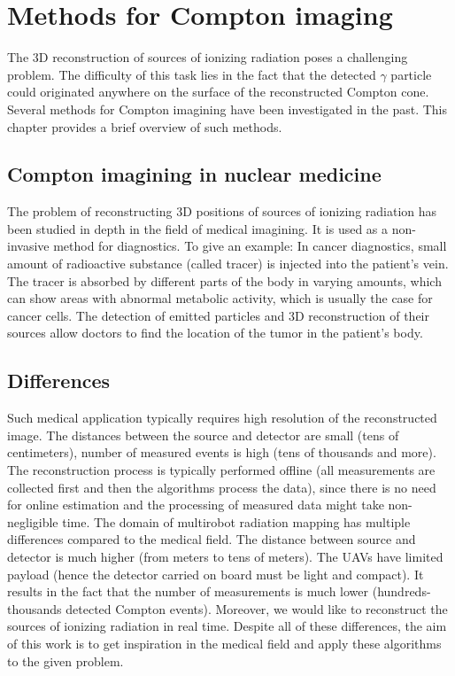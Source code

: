 \chapter{Methods for Compton imaging}
The 3D reconstruction of sources of ionizing radiation poses a challenging problem.
The difficulty of this task lies in the fact that the detected $\gamma$ particle could originated anywhere on the surface of the reconstructed Compton cone.
Several methods for Compton imagining have been investigated in the past.
This chapter provides a brief overview of such methods.

\section{Compton imagining in nuclear medicine}
The problem of reconstructing 3D positions of sources of ionizing radiation has been studied in depth in the field of medical imagining.
It is used as a non-invasive method for diagnostics.
To give an example:
In cancer diagnostics, small amount of radioactive substance (called tracer) is injected into the patient's vein.
The tracer is absorbed by different parts of the body in varying amounts, which can show areas with abnormal metabolic activity, which is usually the case for cancer cells.
The detection of emitted particles and 3D reconstruction of their sources allow doctors to find the location of the tumor in the patient's body.

\section{Differences}
Such medical application typically requires high resolution of the reconstructed image.
The distances between the source and detector are small (tens of centimeters), number of measured events is high (tens of thousands and more).
The reconstruction process is typically performed offline (all measurements are collected first and then the algorithms process the data), since there is no need for online estimation and the processing of measured data might take non-negligible time.
The domain of multirobot radiation mapping has multiple differences compared to the medical field.
The distance between source and detector is much higher (from meters to tens of meters).
The \ac{UAV}s have limited payload (hence the detector carried on board must be light and compact).
It results in the fact that the number of measurements is much lower (hundreds-thousands detected Compton events).
Moreover, we would like to reconstruct the sources of ionizing radiation in real time.
Despite all of these differences, the aim of this work is to get inspiration in the medical field and apply these algorithms to the given problem.

